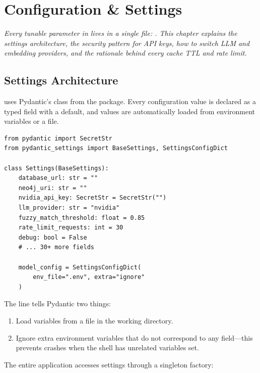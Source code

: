 \chapter{Configuration \& Settings}
\label{ch:configuration}

\textit{Every tunable parameter in \sysname{} lives in a single file:
.  This chapter explains the settings architecture,
the security pattern for API keys, how to switch LLM and embedding providers,
and the rationale behind every cache TTL and rate limit.}


\section{Settings Architecture}
\label{sec:settings-architecture}

\sysname{} uses Pydantic's  class from the
 package.  Every configuration value is declared as a
typed field with a default, and values are automatically loaded from environment
variables or a  file.

\begin{lstlisting}[style=python, caption={The Settings class skeleton (simplified).}]
from pydantic import SecretStr
from pydantic_settings import BaseSettings, SettingsConfigDict

class Settings(BaseSettings):
    database_url: str = ""
    neo4j_uri: str = ""
    nvidia_api_key: SecretStr = SecretStr("")
    llm_provider: str = "nvidia"
    fuzzy_match_threshold: float = 0.85
    rate_limit_requests: int = 30
    debug: bool = False
    # ... 30+ more fields

    model_config = SettingsConfigDict(
        env_file=".env", extra="ignore"
    )
\end{lstlisting}

The  line tells Pydantic two things:

\begin{enumerate}
    \item Load variables from a  file in the working directory.
    \item Ignore extra environment variables that do not correspond to any
          field---this prevents crashes when the shell has unrelated variables set.
\end{enumerate}

The entire application accesses settings through a singleton factory:

